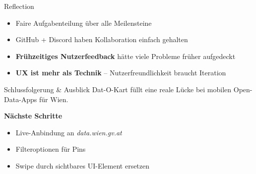 \documentclass{beamer}
\begin{document}
  \begin{frame}{Reflection}
    \begin{itemize}
      \setlength\itemsep{0.7em}
      \item Faire Aufgabenteilung über alle Meilensteine
      \item GitHub + Discord haben Kollaboration einfach gehalten
      \item \textbf{Frühzeitiges Nutzerfeedback} hätte viele Probleme früher aufgedeckt
      \item \textbf{UX ist mehr als Technik} – Nutzerfreundlichkeit braucht Iteration
    \end{itemize}
  \end{frame}

  \begin{frame}{Schlussfolgerung \& Ausblick}
    Dat-O-Kart füllt eine reale Lücke bei mobilen Open-Data-Apps für Wien.

    \vspace{0.5cm}
    \textbf{Nächste Schritte}
    \begin{itemize}
      \item Live-Anbindung an \textit{data.wien.gv.at}
      \item Filteroptionen für Pins
      \item Swipe durch sichtbares UI-Element ersetzen
    \end{itemize}
  \end{frame}


 
\end{document}
